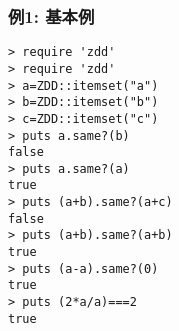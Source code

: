 \subsubsection*{例1: 基本例}



\begin{Verbatim}[baselinestretch=0.7,frame=single]
> require 'zdd'
> require 'zdd'
> a=ZDD::itemset("a")
> b=ZDD::itemset("b")
> c=ZDD::itemset("c")
> puts a.same?(b)
false
> puts a.same?(a)
true
> puts (a+b).same?(a+c)
false
> puts (a+b).same?(a+b)
true
> puts (a-a).same?(0)
true
> puts (2*a/a)===2
true
\end{Verbatim}
